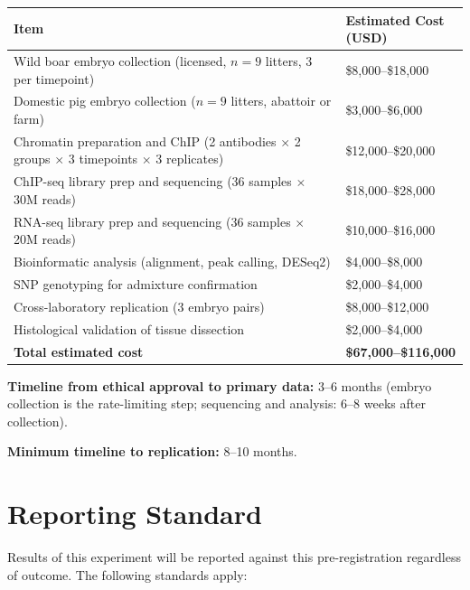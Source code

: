 \documentclass[10pt, a4paper]{article}
\begin{document}
\begin{center}
\small
\begin{tabular}{p{7.0cm}p{5.0cm}}
\toprule
\textbf{Item} & \textbf{Estimated Cost (USD)} \\
\midrule
Wild boar embryo collection
(licensed, $n = 9$ litters, 3 per timepoint) &
\$8,000--\$18,000 \\[0.2em]
Domestic pig embryo collection
($n = 9$ litters, abattoir or farm) &
\$3,000--\$6,000 \\[0.2em]
Chromatin preparation and ChIP
(2 antibodies $\times$ 2 groups
$\times$ 3 timepoints $\times$ 3 replicates) &
\$12,000--\$20,000 \\[0.2em]
ChIP-seq library prep and sequencing
(36 samples $\times$ 30M reads) &
\$18,000--\$28,000 \\[0.2em]
RNA-seq library prep and sequencing
(36 samples $\times$ 20M reads) &
\$10,000--\$16,000 \\[0.2em]
Bioinformatic analysis
(alignment, peak calling, DESeq2) &
\$4,000--\$8,000 \\[0.2em]
SNP genotyping for admixture confirmation &
\$2,000--\$4,000 \\[0.2em]
Cross-laboratory replication
(3 embryo pairs) &
\$8,000--\$12,000 \\[0.2em]
Histological validation of tissue dissection &
\$2,000--\$4,000 \\[0.2em]
\midrule
\textbf{Total estimated cost} &
\textbf{\$67,000--\$116,000} \\
\bottomrule
\end{tabular}
\end{center}

\vspace{0.3em}
\textbf{Timeline from ethical approval
to primary data:}
3--6 months (embryo collection is the
rate-limiting step; sequencing and
analysis: 6--8 weeks after collection).

\textbf{Minimum timeline to replication:}
8--10 months.

\section{Reporting Standard}
\label{sec:reporting}

Results of this experiment will be reported
against this pre-registration regardless of
outcome. The following standards apply:
\end{document}
